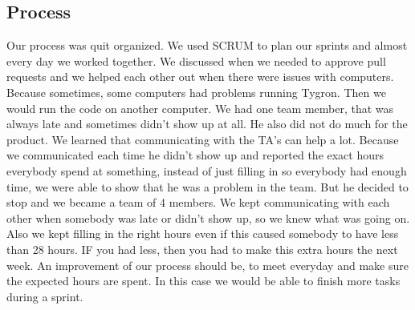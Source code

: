 \subsection{Process}
Our process was quit organized. We used SCRUM to plan our sprints and almost every day we worked together. We discussed when we needed to approve pull requests and we helped each other out when there were issues with computers. Because sometimes, some computers had problems running Tygron. Then we would run the code on another computer. We had one team member, that was always late and sometimes didn't show up at all. He also did not do much for the product. We learned that communicating with the TA's can help a lot. Because we communicated each time he didn't show up and reported the exact hours everybody spend at something, instead of just filling in so everybody had enough time, we were able to show that he was a problem in the team. But he decided to stop and we became a team of 4 members. We kept communicating with each other when somebody was late or didn't show up, so we knew what was going on. Also we kept filling in the right hours even if this caused somebody to have less than 28 hours. IF you had less, then you had to make this extra hours the next week.
An improvement of our process should be, to meet everyday and make sure the expected hours are spent. In this case we would be able to finish more tasks during a sprint.
\newpage
	